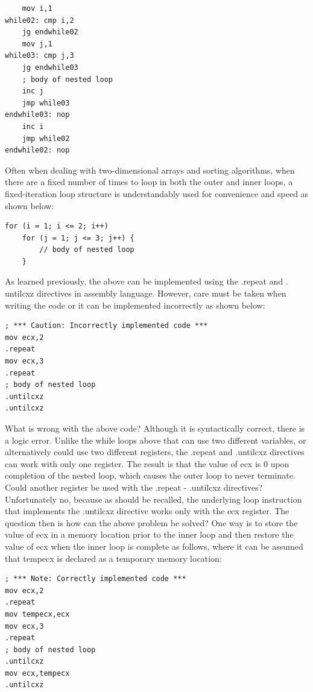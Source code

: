\documentclass[10pt]{book}
\begin{document}
\begin{verbatim}
    mov i,1
while02: cmp i,2
    jg endwhile02
    mov j,1
while03: cmp j,3
    jg endwhile03
    ; body of nested loop
    inc j
    jmp while03
endwhile03: nop
    inc i
    jmp while02
endwhile02: nop
\end{verbatim}

Often when dealing with two-dimensional arrays and sorting algorithms, when there are a fixed number of times to loop in both the outer and inner loops, a fixed-iteration loop structure is understandably used for convenience and speed as shown below:
\begin{verbatim}
for (i = 1; i <= 2; i++)
    for (j = 1; j <= 3; j++) {
        // body of nested loop
    }
\end{verbatim}

As learned previously, the above can be implemented using the .repeat and . untilcxz directives in assembly language. However, care must be taken when writing the code or it can be implemented incorrectly as shown below:

\begin{verbatim}
; *** Caution: Incorrectly implemented code ***
mov ecx,2
.repeat
mov ecx,3
.repeat
; body of nested loop
.untilcxz
.untilcxz
\end{verbatim}

What is wrong with the above code? Although it is syntactically correct, there is a logic error. Unlike the while loops above that can use two different variables, or alternatively could use two different registers, the .repeat and .untilcxz directives can work with only one register. The result is that the value of ecx is 0 upon completion of the nested loop, which causes the outer loop to never terminate. Could another register be used with the .repeat - .untilcxz directives? Unfortunately no, because as should be recalled, the underlying loop instruction that implements the .untilcxz directive works only with the ecx register. The question then is how can the above problem be solved? One way is to store the value of ecx in a memory location prior to the inner loop and then restore the value of ecx when the inner loop is complete as follows, where it can be assumed that tempecx is declared as a temporary memory location:
\begin{verbatim}
; *** Note: Correctly implemented code ***
mov ecx,2
.repeat
mov tempecx,ecx
mov ecx,3
.repeat
; body of nested loop
.untilcxz
mov ecx,tempecx
.untilcxz
\end{verbatim}
\end{document}

